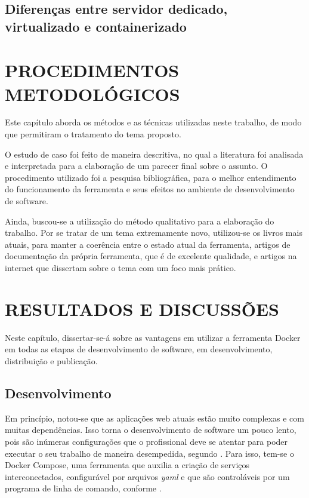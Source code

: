 \documentclass[
	12pt,				%
	openright,			%
	oneside,			%
	a4paper,			%
	chapter=TITLE,		%
	section=TITLE,		%
	english,			%
	french,				%
	spanish,			%
	brazil				%
	]{abntex2}
\begin{document}
\section{Diferenças entre servidor dedicado, virtualizado e containerizado}



\chapter{PROCEDIMENTOS METODOLÓGICOS}

Este capítulo aborda os métodos e as técnicas utilizadas neste trabalho, de modo que permitiram o tratamento do tema proposto.

O estudo de caso foi feito de maneira descritiva, no qual a literatura foi analisada e interpretada para a elaboração de um parecer final sobre o assunto. O procedimento utilizado foi a pesquisa bibliográfica, para o melhor entendimento do funcionamento da ferramenta e seus efeitos no ambiente de desenvolvimento de software.

Ainda, buscou-se a utilização do método qualitativo para a elaboração do trabalho. Por se tratar de um tema extremamente novo, utilizou-se os livros mais atuais, para manter a coerência entre o estado atual da ferramenta, artigos de documentação da própria ferramenta, que é de excelente qualidade, e artigos na internet que dissertam sobre o tema com um foco mais prático.

\chapter{RESULTADOS E DISCUSSÕES}

Neste capítulo, dissertar-se-á sobre as vantagens em utilizar a ferramenta Docker em todas as etapas de desenvolvimento de software, em desenvolvimento, distribuição e publicação.

\section{Desenvolvimento}

Em princípio, notou-se que as aplicações web atuais estão muito complexas e com muitas dependências. Isso torna o desenvolvimento de software um pouco lento, pois são inúmeras configurações que o profissional deve se atentar para poder executar o seu trabalho de maneira desempedida, segundo . Para isso, tem-se o Docker Compose, uma ferramenta que auxilia a criação de serviços interconectados, configurável por arquivos \textit{yaml} e que são controláveis por um programa de linha de comando, conforme .
\end{document}
